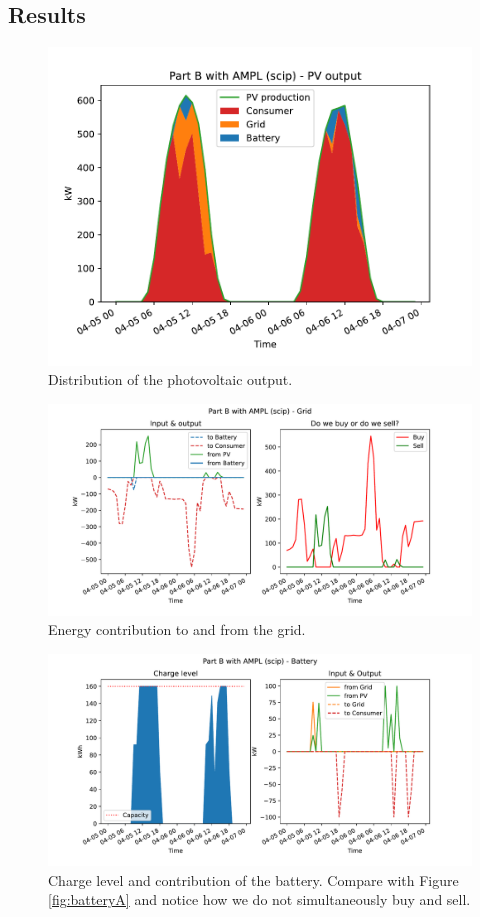 \documentclass[12pt]{article}
\begin{document}
\subsection{Results}
\begin{figure}[p]
    \centering
    \includegraphics[width=\textwidth]{PartB/pv_output}
    \caption{Distribution of the photovoltaic output.}
\end{figure}

\begin{figure}[p]
    \centering
    \includegraphics[width=\textwidth]{PartB/grid}
    \caption{Energy contribution to and from the grid.}
\end{figure}

\begin{figure}[p]
    \centering
    \includegraphics[width=\textwidth]{PartB/battery}
    \caption{Charge level and contribution of the battery. Compare with Figure \ref{fig:batteryA} and notice how we do not simultaneously buy and sell.}
    \label{fig:batteryB}
\end{figure}
\end{document}
